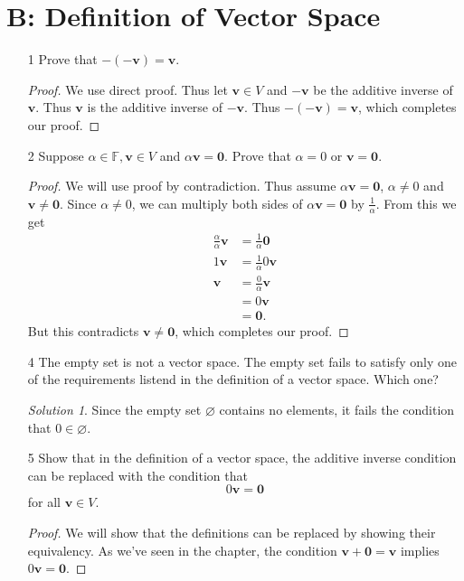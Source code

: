 \documentclass[11pt, b5paper, draft, fleqn]{book}
\theoremstyle{remark}
\newtheorem*{solution}{Solution}
\theoremstyle{definition}
\begin{document}
\section{B: Definition of Vector Space}
\begin{enumerate}
	\item[1] Prove that \(-(-\mathbf{v}) = \mathbf{v}\).
	\begin{proof}
		We use direct proof. Thus let \(\mathbf{v} \in V\) and \(\mathbf{-v}\) be the additive inverse of \(\mathbf{v}\). Thus \(\mathbf{v}\) is the additive inverse of \(\mathbf{-v}\). Thus \(-(\mathbf{-v}) = \mathbf{v}\), which completes our proof.
	\end{proof}
	
	\item[2] Suppose \(\alpha \in \mathbb{F}, \mathbf{v} \in V\) and \(\alpha \mathbf{v} = \mathbf{0}\). Prove that \(\alpha = 0\) or \(\mathbf{v} = \mathbf{0}\).
	\begin{proof}
		We will use proof by contradiction. Thus assume \(\alpha \mathbf{v} = \mathbf{0}\), \(\alpha \ne 0\) and \(\mathbf{v} \ne \mathbf{0}\). Since \(\alpha \ne 0\), we can multiply both sides of \(\alpha \mathbf{v} = \mathbf{0}\) by \(\frac{1}{\alpha}\). From this we get
		\begin{equation*}
		\begin{split}
			\frac{\alpha}{\alpha} \mathbf{v} & = \frac{1}{\alpha} \mathbf{0} \\
			1 \mathbf{v} & = \frac{1}{\alpha} 0\mathbf{v} \\
			\mathbf{v} & = \frac{0}{\alpha} \mathbf{v} \\
			& = 0 \mathbf{v} \\
			& = \mathbf{0}.
		\end{split}
		\end{equation*}
		But this contradicts \(\mathbf{v} \ne \mathbf{0}\), which completes our proof.
	\end{proof}
	
	\item[4] The empty set is not a vector space. The empty set fails to satisfy only one of the requirements listend in the definition of a vector space. Which one?
	\begin{solution}
		Since the empty set \(\varnothing\) contains no elements, it fails the condition that \(0 \in \varnothing\).
	\end{solution}
	
	\item[5] Show that in the definition of a vector space, the additive inverse condition can be replaced with the condition that \[0 \mathbf{v} = \mathbf{0}\] for all \(\mathbf{v} \in V\).
	\begin{proof}
		We will show that the definitions can be replaced by showing their equivalency. As we've seen in the chapter, the condition \(\mathbf{v} + \mathbf{0} = \mathbf{v}\) implies \(0 \mathbf{v} = \mathbf{0}\). 
		

\end{proof}
\end{enumerate}
\end{document}
